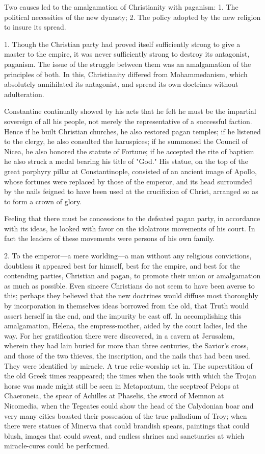 Two causes led to the amalgamation of Christianity with paganism: 1. The political
necessities of the new dynasty; 2. The policy adopted by the new religion to insure its spread.

1. Though the Christian party had proved itself sufficiently strong to give a master to the
empire, it was never sufficiently strong to destroy its antagonist, paganism. The issue of the
struggle between them was an amalgamation of the principles of both. In this, Christianity
differed from Mohammedanism, which absolutely annihilated its antagonist, and spread its
own doctrines without adulteration.

Constantine continually showed by his acts that he felt he must be the impartial sovereign of
all his people, not merely the representative of a successful faction. Hence if he built
Christian churches, he also restored pagan temples; if he listened to the clergy, he also
consulted the haruspices; if he summoned the Council of Nicea, he also honored the statute
of Fortune; if he accepted the rite of baptism he also struck a medal bearing his title of
"God." His statue, on the top of the great porphyry pillar at Constantinople, consisted of an
ancient image of Apollo, whose fortunes were replaced by those of the emperor, and its head
surrounded by the nails feigned to have been used at the crucifixion of Christ, arranged so as
to form a crown of glory.

Feeling that there must be concessions to the defeated pagan party, in accordance with its
ideas, he looked with favor on the idolatrous movements of his court. In fact the leaders of
these movements were persons of his own family.

2. To the emperor—a mere worlding—a man without any religious convictions, doubtless it
appeared best for himself, best for the empire, and best for the contending parties, Christian
and pagan, to promote their union or amalgamation as much as possible. Even sincere
Christians do not seem to have been averse to this; perhaps they believed that the new
doctrines would diffuse most thoroughly by incorporation in themselves ideas borrowed from
the old, that Truth would assert herself in the end, and the impurity be cast off. In
accomplishing this amalgamation, Helena, the empress-mother, aided by the court ladies, led
the way. For her gratification there were discovered, in a cavern at Jerusalem, wherein they
had lain buried for more than three centuries, the Savior's cross, and those of the two thieves,
the inscription, and the nails that had been used. They were identified by miracle. A true
relic-worship set in. The superstition of the old Greek times reappeared; the times when the
tools with which the Trojan horse was made might still be seen in Metapontum, the sceptreof Pelops at Chaeroneia, the spear of Achilles at Phaselis, the sword of Memnon at
Nicomedia, when the Tegeates could show the head of the Calydonian boar and very many
cities boasted their possession of the true palladium of Troy; when there were statues of
Minerva that could brandish spears, paintings that could blush, images that could sweat, and
endless shrines and sanctuaries at which miracle-cures could be performed.

